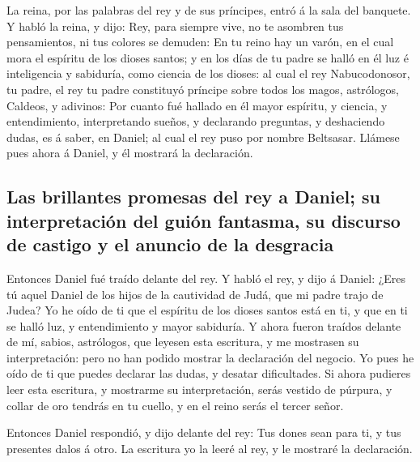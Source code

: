  La reina, por las palabras del rey y de sus príncipes,
entró á la sala del banquete. Y habló la reina, y dijo: Rey, para
siempre vive, no te asombren tus pensamientos, ni tus colores se
demuden:  En tu reino hay un varón, en el cual mora el
espíritu de los dioses santos; y en los días de tu padre se halló en él
luz é inteligencia y sabiduría, como ciencia de los dioses: al cual el
rey Nabucodonosor, tu padre, el rey tu padre constituyó príncipe sobre
todos los magos, astrólogos, Caldeos, y adivinos:  Por
cuanto fué hallado en él mayor espíritu, y ciencia, y entendimiento,
interpretando sueños, y declarando preguntas, y deshaciendo dudas, es á
saber, en Daniel; al cual el rey puso por nombre Beltsasar. Llámese pues
ahora á Daniel, y él mostrará la declaración.

\hypertarget{las-brillantes-promesas-del-rey-a-daniel-su-interpretaciuxf3n-del-guiuxf3n-fantasma-su-discurso-de-castigo-y-el-anuncio-de-la-desgracia}{%
\subsection{Las brillantes promesas del rey a Daniel; su interpretación
del guión fantasma, su discurso de castigo y el anuncio de la
desgracia}\label{las-brillantes-promesas-del-rey-a-daniel-su-interpretaciuxf3n-del-guiuxf3n-fantasma-su-discurso-de-castigo-y-el-anuncio-de-la-desgracia}}

 Entonces Daniel fué traído delante del rey. Y habló el
rey, y dijo á Daniel: ¿Eres tú aquel Daniel de los hijos de la
cautividad de Judá, que mi padre trajo de Judea?  Yo he
oído de ti que el espíritu de los dioses santos está en ti, y que en ti
se halló luz, y entendimiento y mayor sabiduría.  Y ahora
fueron traídos delante de mí, sabios, astrólogos, que leyesen esta
escritura, y me mostrasen su interpretación: pero no han podido mostrar
la declaración del negocio.  Yo pues he oído de ti que
puedes declarar las dudas, y desatar dificultades. Si ahora pudieres
leer esta escritura, y mostrarme su interpretación, serás vestido de
púrpura, y collar de oro tendrás en tu cuello, y en el reino serás el
tercer señor.

 Entonces Daniel respondió, y dijo delante del rey: Tus
dones sean para ti, y tus presentes dalos á otro. La escritura yo la
leeré al rey, y le mostraré la declaración.

